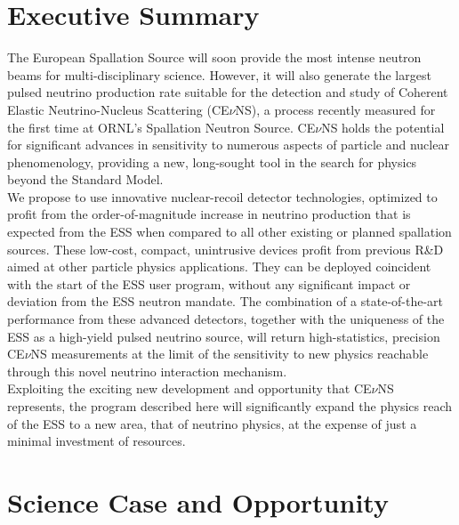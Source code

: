 \documentclass[12pt]{article}
\begin{document}
\clearpage
\newpage
\tableofcontents
\newpage     


\section{Executive Summary}

The European Spallation Source will soon provide the most intense neutron beams for
multi-disciplinary science. However, it will also generate the
largest pulsed neutrino production rate suitable for the detection and study of Coherent
Elastic Neutrino-Nucleus Scattering (CE$\nu$NS), a process recently
measured for the first time at ORNL's Spallation Neutron Source. CE$\nu$NS holds the potential for significant advances in sensitivity to numerous aspects of particle and nuclear phenomenology, providing a new, long-sought tool in the search for physics beyond the Standard Model.\\

We propose to use innovative nuclear-recoil detector technologies, optimized to profit
from the order-of-magnitude increase in neutrino production that is expected from 
the ESS when compared to all other existing or planned spallation sources. These low-cost, compact, unintrusive devices profit from previous R\&D aimed at other particle physics applications. They can be deployed coincident with the start of the ESS user program, without any significant impact or deviation from the ESS neutron mandate. The combination of a state-of-the-art performance from these advanced detectors, together with the uniqueness of the ESS as a high-yield pulsed neutrino source, will return high-statistics, precision CE$\nu$NS
measurements at the limit of the sensitivity to new physics reachable through this novel neutrino interaction mechanism. \\

Exploiting the exciting new development and opportunity that CE$\nu$NS represents, the program described here will significantly expand the physics reach of the ESS to a new area, that of neutrino physics, at the expense of just a minimal investment of resources. 

\newpage

\section{Science Case and Opportunity}
\end{document}

